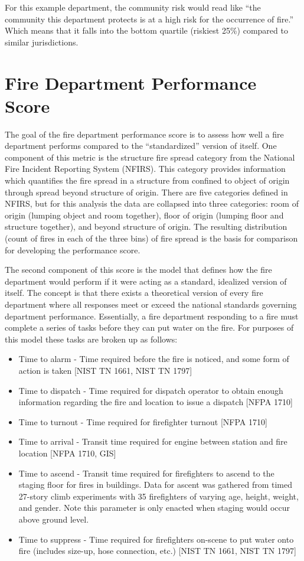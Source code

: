 \documentclass[12pt,oneside]{book}
\begin{document}
For this example department, the community risk would read like ``the community this department protects is at a high risk for the occurrence of fire.'' Which means that it falls into the bottom quartile (riskiest 25\%) compared to similar jurisdictions.

\section{Fire Department Performance Score}

The goal of the fire department performance score is to assess how well a fire department performs compared to the ``standardized'' version of itself. One component of this metric is the structure fire spread category from the National Fire Incident Reporting System (NFIRS). This category provides information which quantifies the fire spread in a structure from confined to object of origin through spread beyond structure of origin. There are five categories defined in NFIRS, but for this analysis the data are collapsed into three categories: room of origin (lumping object and room together), floor of origin (lumping floor and structure together), and beyond structure of origin. The resulting distribution (count of fires in each of the three bins) of fire spread is the basis for comparison for developing the performance score.

The second component of this score is the model that defines how the fire department would perform if it were acting as a standard, idealized version of itself. The concept is that there exists a theoretical version of every fire department where all responses meet or exceed the national standards governing department performance. Essentially, a fire department responding to a fire must complete a series of tasks before they can put water on the fire. For purposes of this model these tasks are broken up as follows:

\begin{itemize}
\item Time to alarm - Time required before the fire is noticed, and some form of action is taken [NIST TN 1661, NIST TN 1797]
\item Time to dispatch - Time required for dispatch operator to obtain enough information regarding the fire and location to issue a dispatch [NFPA 1710]
\item Time to turnout - Time required for firefighter turnout [NFPA 1710]
\item Time to arrival - Transit time required for engine between station and fire location [NFPA 1710, GIS]
\item Time to ascend - Transit time required for firefighters to ascend to the staging floor for fires in buildings. Data for ascent was gathered from timed 27-story climb experiments with 35 firefighters of varying age, height, weight, and gender. Note this parameter is only enacted when staging would occur above ground level.
\item Time to suppress - Time required for firefighters on-scene to put water onto fire (includes size-up, hose connection, etc.) [NIST TN 1661, NIST TN 1797]
\end{itemize}
\end{document}
